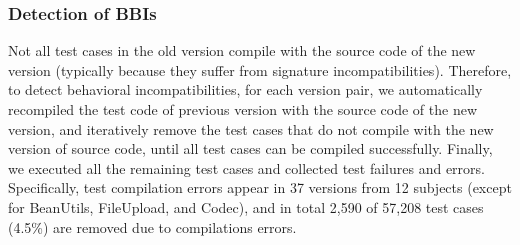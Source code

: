 










\subsubsection{Detection of BBIs}
\label{subsec:incompDetect}

Not all test cases in the old version compile with the source code of the new version (typically because they suffer from signature incompatibilities). Therefore, to detect behavioral incompatibilities, for each version pair, we automatically recompiled the test code of previous version with the source code of the new version, and iteratively remove the test cases that do not compile with the new version of source code, until all test cases can be compiled successfully. Finally, we executed all the remaining test cases and collected test failures and errors. Specifically, test compilation errors appear in 37 versions from 12 subjects (except for BeanUtils, FileUpload, and Codec), and in total 2,590 of 57,208 test cases (4.5\%) are removed due to compilations errors. 

